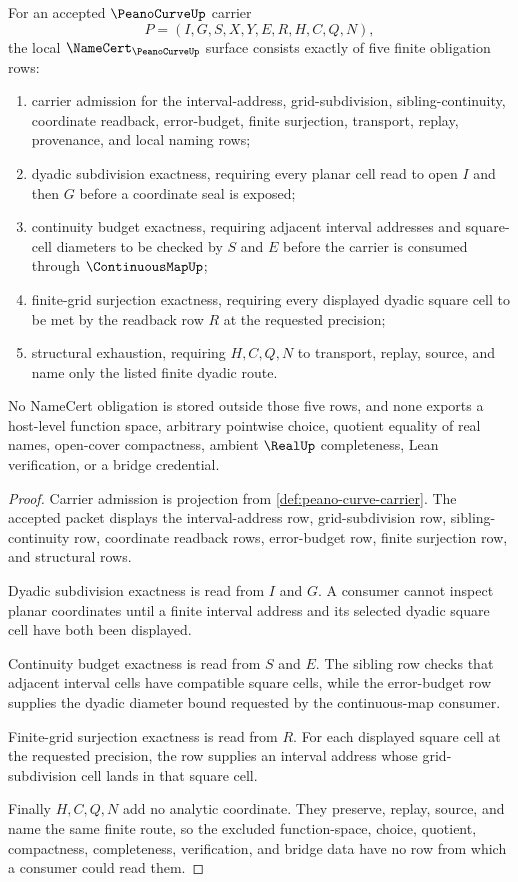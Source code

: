 \begin{theorem}
\label{thm:peano-curve-namecert-obligations}
For an accepted $\PeanoCurveUp$ carrier
$$
P=(I,G,S,X,Y,E,R,H,C,Q,N),
$$
the local $\NameCert_{\PeanoCurveUp}$ surface consists exactly of five finite obligation rows:
\begin{enumerate}
\item carrier admission for the interval-address, grid-subdivision, sibling-continuity, coordinate readback, error-budget, finite surjection, transport, replay, provenance, and local naming rows;
\item dyadic subdivision exactness, requiring every planar cell read to open $I$ and then $G$ before a coordinate seal is exposed;
\item continuity budget exactness, requiring adjacent interval addresses and square-cell diameters to be checked by $S$ and $E$ before the carrier is consumed through $\ContinuousMapUp$;
\item finite-grid surjection exactness, requiring every displayed dyadic square cell to be met by the readback row $R$ at the requested precision;
\item structural exhaustion, requiring $H,C,Q,N$ to transport, replay, source, and name only the listed finite dyadic route.
\end{enumerate}
No NameCert obligation is stored outside those five rows, and none exports a host-level function space, arbitrary pointwise choice, quotient equality of real names, open-cover compactness, ambient $\RealUp$ completeness, Lean verification, or a bridge credential.
\end{theorem}
\begin{proof}
Carrier admission is projection from \autoref{def:peano-curve-carrier}. The accepted packet displays the interval-address row, grid-subdivision row, sibling-continuity row, coordinate readback rows, error-budget row, finite surjection row, and structural rows.

Dyadic subdivision exactness is read from $I$ and $G$. A consumer cannot inspect planar coordinates until a finite interval address and its selected dyadic square cell have both been displayed.

Continuity budget exactness is read from $S$ and $E$. The sibling row checks that adjacent interval cells have compatible square cells, while the error-budget row supplies the dyadic diameter bound requested by the continuous-map consumer.

Finite-grid surjection exactness is read from $R$. For each displayed square cell at the requested precision, the row supplies an interval address whose grid-subdivision cell lands in that square cell.

Finally $H,C,Q,N$ add no analytic coordinate. They preserve, replay, source, and name the same finite route, so the excluded function-space, choice, quotient, compactness, completeness, verification, and bridge data have no row from which a consumer could read them.
\end{proof}

